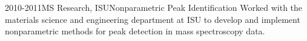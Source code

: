 \documentclass[10pt]{tccv}
\begin{document}
\begin{eventlist}
\item{2010-2011}{MS Research, ISU}{Nonparametric Peak Identification}{
Worked with the materials science and engineering department at ISU to develop and implement nonparametric methods for peak detection in mass spectroscopy data.
}

% 
\end{eventlist}
% 
% 
% 
\end{document}
